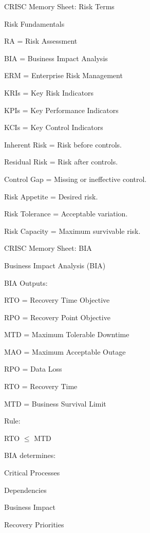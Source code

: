 \documentclass{beamer}
\begin{document}
	
	
	
	\begin{frame}[shrink=10]{CRISC Memory Sheet: Risk Terms}
		\begin{block}{Risk Fundamentals}
			
			RA = Risk Assessment
			
			BIA = Business Impact Analysis
			
			ERM = Enterprise Risk Management
			
			KRIs = Key Risk Indicators
			
			KPIs = Key Performance Indicators
			
			KCIs = Key Control Indicators
			
			\vspace{0.15cm}
			
			Inherent Risk
			= Risk before controls.
			
			Residual Risk
			= Risk after controls.
			
			Control Gap
			= Missing or ineffective control.
			
			\vspace{0.15cm}
			
			Risk Appetite
			= Desired risk.
			
			Risk Tolerance
			= Acceptable variation.
			
			Risk Capacity
			= Maximum survivable risk.
			
		\end{block}
	\end{frame}
	
	\begin{frame}[shrink=10]{CRISC Memory Sheet: BIA}
		\begin{block}{Business Impact Analysis (BIA)}
			
			BIA Outputs:
			
			RTO = Recovery Time Objective
			
			RPO = Recovery Point Objective
			
			MTD = Maximum Tolerable Downtime
			
			MAO = Maximum Acceptable Outage
			
			\vspace{0.15cm}
			
			RPO = Data Loss
			
			RTO = Recovery Time
			
			MTD = Business Survival Limit
			
			\vspace{0.15cm}
			
			Rule:
			
			RTO $\leq$ MTD
			
			\vspace{0.15cm}
			
			BIA determines:
			
			Critical Processes
			
			Dependencies
			
			Business Impact
			
			Recovery Priorities
			
		\end{block}
	\end{frame}
	
\end{document}
